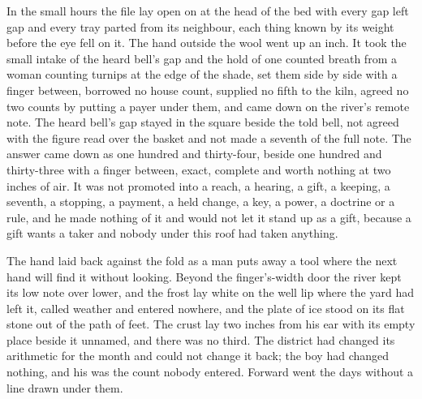 In the small hours the file lay open on  at the head of the bed with every gap left gap and every tray parted from its neighbour, each thing known by its weight before the eye fell on it. The hand outside the wool went up an inch. It took the small intake of the heard bell's gap and the hold of one counted breath from a woman counting turnips at the edge of the shade, set them side by side with a finger between, borrowed no house count, supplied no fifth to the kiln, agreed no two counts by putting a payer under them, and came down on the river's remote note. The heard bell's gap stayed in the square beside the told bell, not agreed with the figure read over the basket and not made a seventh of the full note. The answer came down as one hundred and thirty-four, beside one hundred and thirty-three with a finger between, exact, complete and worth nothing at two inches of air. It was not promoted into a reach, a hearing, a gift, a keeping, a seventh, a stopping, a payment, a held change, a key, a power, a doctrine or a rule, and he made nothing of it and would not let it stand up as a gift, because a gift wants a taker and nobody under this roof had taken anything.

The hand laid back against the fold as a man puts away a tool where the next hand will find it without looking. Beyond the finger's-width door the river kept its low note over lower, and the frost lay white on the well lip where the yard had left it, called weather and entered nowhere, and the plate of ice stood on its flat stone out of the path of feet. The crust lay two inches from his ear with its empty place beside it unnamed, and there was no third. The district had changed its arithmetic for the month and could not change it back; the boy had changed nothing, and his was the count nobody entered. Forward went the days without a line drawn under them.
